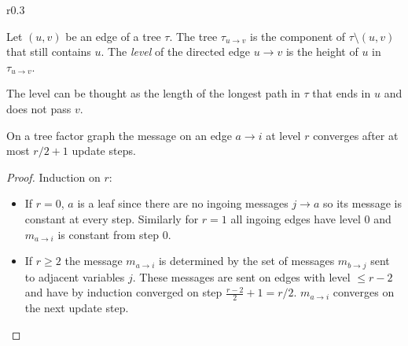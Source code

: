 \begin{wrapfigure}{r}{0.3\textwidth}

\end{wrapfigure}
\begin{definition} Let $(u, v)$ be an edge of a tree $\tau$. \newline
The tree $\tau_{u \rightarrow v}$ is the component of $\tau \setminus (u, v)$ that still contains $u$. The \emph{level} of the directed edge $u \rightarrow v$ is the height of $u$ in $\tau_{u \rightarrow v}$. 
\end{definition}
The level can be thought as the length of the longest path in $\tau$ that ends in $u$ and does not pass $v$.
\begin{lemma}\cite{survprob}
On a tree factor graph the message on an edge $a \rightarrow i$ at level $r$ converges after at most $r/2 + 1$ update steps.
\begin{proof} Induction on $r$:
\begin{itemize}
\item[] If $r = 0$, $a$ is a leaf since there are no ingoing messages $j \rightarrow a$ so its message is constant at every step. \newline
Similarly for $r = 1$ all ingoing edges have level $0$ and $m_{a \rightarrow i}$ is constant from step $0$.
\item[] If $r \geq 2$ the message $m_{a \rightarrow i}$ is determined by the set of messages $m_{b \rightarrow j}$ sent to adjacent variables $j$. These messages are sent on edges with level $\leq r-2$ and have by induction converged on step $\frac{r-2}{2} + 1 = r / 2$. $m_{a \rightarrow i}$ converges on the next update step.
\end{itemize}
\end{proof}
\end{lemma}

